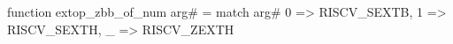function extop_zbb_of_num arg# = match arg# {
  0 => RISCV_SEXTB,
  1 => RISCV_SEXTH,
  _ => RISCV_ZEXTH
}
